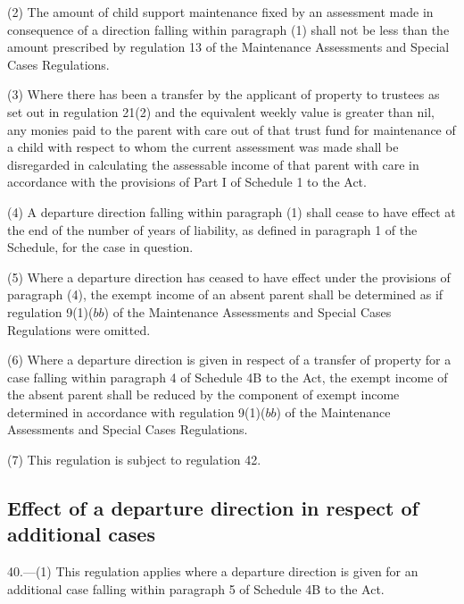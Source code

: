 \documentclass[a4paper]{article}
\begin{document}
(2) The amount of child support maintenance fixed by an assessment made in
consequence of a direction falling within paragraph (1) shall not be less than
the amount prescribed by regulation 13 of the Maintenance Assessments and
Special Cases Regulations.

(3) Where there has been a transfer by the applicant of property to trustees as
set out in regulation 21(2) and the equivalent weekly value is greater than nil,
any monies paid to the parent with care out of that trust fund for maintenance
of a child with respect to whom the current assessment was made shall be
disregarded in calculating the assessable income of that parent with care in
accordance with the provisions of Part I of Schedule 1 to the Act.

(4) A departure direction falling within paragraph (1) shall cease to have
effect at the end of the number of years of liability, as defined in paragraph 1
of the Schedule, for the case in question.

(5) Where a departure direction has ceased to have effect under the provisions
of paragraph (4), the exempt income of an absent parent shall be determined as
if regulation 9(1)($bb$) of the Maintenance Assessments and Special Cases
Regulations were omitted.

(6) Where a departure direction is given in respect of a transfer of property
for a case falling within paragraph 4 of Schedule 4B to the Act, the exempt
income of the absent parent shall be reduced by the component of exempt income
determined in accordance with regulation 9(1)($bb$) of the Maintenance Assessments
and Special Cases Regulations.

(7) This regulation is subject to regulation 42.

\subsection[40. Effect of a departure direction in respect of additional cases]{Effect of a departure direction in respect of additional cases}

40.—(1) This
regulation applies where a departure direction is given for an additional case
falling within paragraph 5 of Schedule 4B to the Act.
\end{document}
